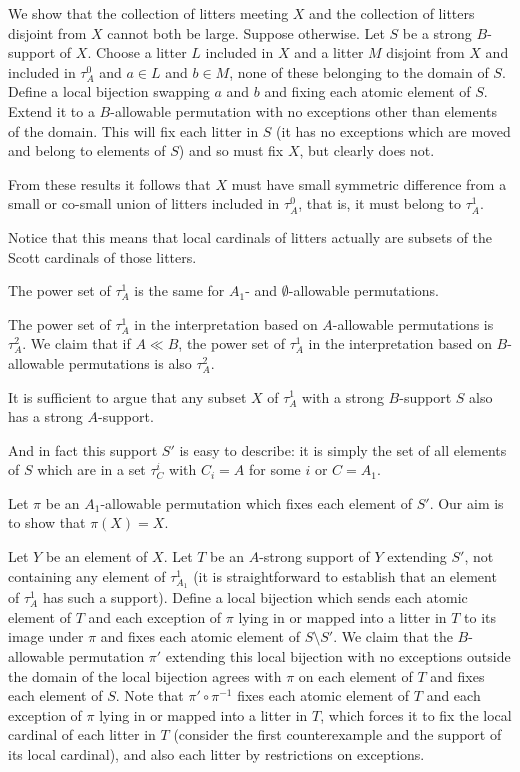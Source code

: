 \documentclass{slides}
\begin{document}
\begin{slide}
We show that the collection of litters meeting $X$ and the collection of litters disjoint from $X$ cannot both be large.  Suppose otherwise.  Let $S$ be a strong $B$-support of $X$.
Choose a litter $L$ included in $X$ and a litter $M$ disjoint from $X$ and included in $\tau^0_A$  and $a \in L$ and $b \in M$, none of these belonging to the domain of $S$.  Define a local bijection swapping $a$ and $b$ and fixing each atomic element of $S$.  Extend it to a $B$-allowable permutation with no exceptions other than elements of the domain.  This will fix
each litter in $S$ (it has no exceptions which are moved and belong to elements of $S$) and so must fix $X$, but clearly does not.

From these results it follows that $X$ must have small symmetric difference from a small or co-small union of litters included in $\tau^0_A$, that is, it must belong to $\tau^1_A$.

Notice that this means that local cardinals of litters actually are subsets of the Scott cardinals of those litters.

\end{slide}

{\Large The power set of $\tau^1_A$ is the same for $A_1$- and $\emptyset$-allowable permutations.}

The power set of $\tau^1_A$ in the interpretation based on $A$-allowable permutations is $\tau^2_A$.  We claim that if $A \ll B$, the power set of  $\tau^1_A$ in
the interpretation based on $B$-allowable permutations is also $\tau^2_A$.

It is sufficient to argue that any subset $X$ of $\tau^1_A$ with a strong $B$-support $S$ also has a strong $A$-support.

And in fact this support $S'$ is easy to describe:  it is simply the set of all elements of $S$ which are in a set $\tau^i_C$ with $C_i = A$ for some $i$ or $C=A_1$.

Let $\pi$ be an $A_1$-allowable permutation which fixes each element of $S'$.  Our aim is to show that $\pi(X)=X$.

Let $Y$ be an element of $X$.  Let $T$ be an $A$-strong support of $Y$ extending $S'$, not containing any element of $\tau^1_{A_1}$ (it is straightforward to establish that
an element of $\tau^1_A$ has such a support).  Define a local bijection which sends each atomic element of $T$ and each exception of $\pi$ lying in or mapped into a litter in $T$ to its image under $\pi$
and fixes each atomic element of $S \setminus S'$.  We claim that the $B$-allowable permutation $\pi'$ extending this local bijection with no exceptions outside the domain of the local bijection  agrees with $\pi$ on each element of $T$ and fixes each element of $S$.  Note that $\pi' \circ \pi^{-1}$ fixes each atomic element of $T$ and each exception of $\pi$ lying in or mapped into a litter in $T$, which forces it to fix the local cardinal of each litter in $T$ (consider the first counterexample and the support of its local cardinal), and also each litter by restrictions on exceptions. 
\end{document}
